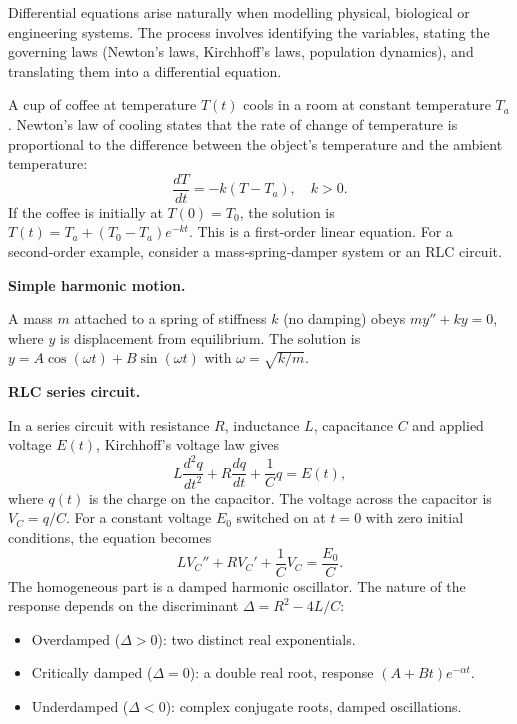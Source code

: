 \documentclass[11pt]{article}
\newcounter{popsec}
\newcounter{popsub}
\newcommand{\courssub}[1]{%
  \stepcounter{popsub}%
  \par\vspace{9pt}\noindent{\popxbold\fontsize{11.5}{13}\selectfont\color{popink}{\color{poporange}\thepopsec.\thepopsub}\hspace{6pt}#1}\par\nopagebreak\vspace{4pt}
}
\begin{document}
\courssub{Modelling Applications}

Differential equations arise naturally when modelling physical, biological or engineering systems. The process involves identifying the variables, stating the governing laws (Newton's laws, Kirchhoff's laws, population dynamics), and translating them into a differential equation.

\begin{experience}
A cup of coffee at temperature \(T(t)\) cools in a room at constant temperature \(T_a\). Newton's law of cooling states that the rate of change of temperature is proportional to the difference between the object's temperature and the ambient temperature:
\[
\frac{dT}{dt} = -k(T - T_a), \quad k>0.
\]
If the coffee is initially at \(T(0)=T_0\), the solution is \(T(t) = T_a + (T_0 - T_a)e^{-kt}\). This is a first‑order linear equation. For a second‑order example, consider a mass‑spring‑damper system or an RLC circuit.
\end{experience}

\textbf{Simple harmonic motion.}\par
A mass \(m\) attached to a spring of stiffness \(k\) (no damping) obeys \(m y'' + k y = 0\), where \(y\) is displacement from equilibrium. The solution is \(y = A\cos(\omega t) + B\sin(\omega t)\) with \(\omega = \sqrt{k/m}\).

\textbf{RLC series circuit.}\par
In a series circuit with resistance \(R\), inductance \(L\), capacitance \(C\) and applied voltage \(E(t)\), Kirchhoff's voltage law gives
\[
L\frac{d^2q}{dt^2} + R\frac{dq}{dt} + \frac{1}{C}q = E(t),
\]
where \(q(t)\) is the charge on the capacitor. The voltage across the capacitor is \(V_C = q/C\). For a constant voltage \(E_0\) switched on at \(t=0\) with zero initial conditions, the equation becomes
\[
L V_C'' + R V_C' + \frac{1}{C}V_C = \frac{E_0}{C}.
\]
The homogeneous part is a damped harmonic oscillator. The nature of the response depends on the discriminant \(\Delta = R^2 - 4L/C\):
\begin{itemize}
\item Overdamped (\(\Delta>0\)): two distinct real exponentials.
\item Critically damped (\(\Delta=0\)): a double real root, response \( (A+Bt)e^{-\alpha t}\).
\item Underdamped (\(\Delta<0\)): complex conjugate roots, damped oscillations.
\end{itemize}
\end{document}
